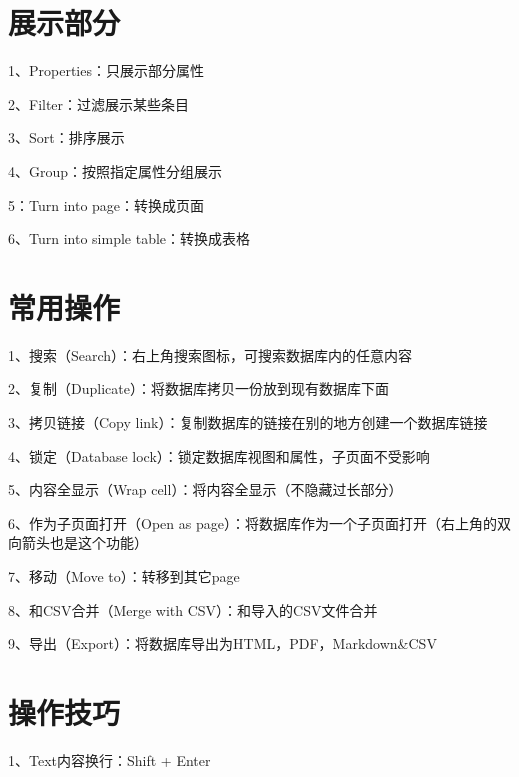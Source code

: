\section{展示部分}

1、Properties：只展示部分属性

2、Filter：过滤展示某些条目

3、Sort：排序展示

4、Group：按照指定属性分组展示

5：Turn into page：转换成页面

6、Turn into simple table：转换成表格

\section{常用操作}

1、搜索（Search）：右上角搜索图标，可搜索数据库内的任意内容

2、复制（Duplicate）：将数据库拷贝一份放到现有数据库下面

3、拷贝链接（Copy link）：复制数据库的链接在别的地方创建一个数据库链接

4、锁定（Database lock）：锁定数据库视图和属性，子页面不受影响

5、内容全显示（Wrap cell）：将内容全显示（不隐藏过长部分）

6、作为子页面打开（Open as page）：将数据库作为一个子页面打开（右上角的双向箭头也是这个功能）

7、移动（Move to）：转移到其它page

8、和CSV合并（Merge with CSV）：和导入的CSV文件合并

9、导出（Export）：将数据库导出为HTML，PDF，Markdown\&CSV

\section{操作技巧}

1、Text内容换行：Shift + Enter

